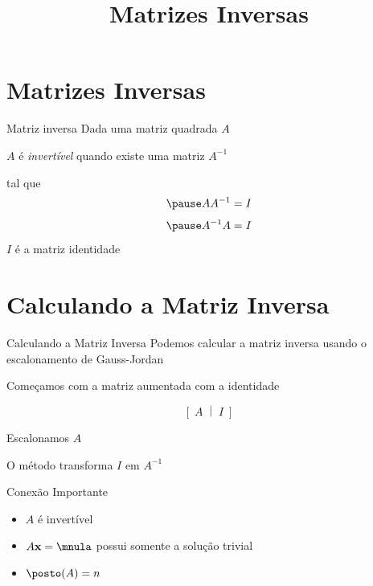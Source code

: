 \documentclass[fleqn,aspectratio=169,12pt]{beamer}
\title{Matrizes Inversas}
\begin{document}
\addtitle

\section{Matrizes Inversas}

\begin{frame}{Matriz inversa}
  Dada uma matriz quadrada $A$

  \pause
  $A$ é \emph{invertível}
  \pause
  quando existe uma matriz
  \emph{$A^{-1}$}

  \pause
  tal que
  \[
    \pause
    A A^{-1} = I
  \]
  \[
    \pause
    A^{-1} A = I
  \]
  \pause
  $I$ é a matriz identidade
\end{frame}



\section{Calculando a Matriz Inversa}

\begin{frame}{Calculando a Matriz Inversa}
  Podemos calcular a matriz inversa usando o escalonamento de Gauss-Jordan

  \pause
  Começamos com a matriz aumentada com a identidade

  \[
    \left[ \;A\; \middle| \;I\; \right]
  \]

  \pause
  Escalonamos $A$

  \pause
  O método transforma $I$ em $A^{-1}$
\end{frame}





\begin{frame}{Conexão Importante}
  \begin{itemize}[<+->]
  \setlength{\itemsep}{1em}
  \item
    \(
      A \text{ é invertível}
    \)
  \item
    \(
      A \mathbf{x} = \mnula
    \)
    possui somente a solução trivial
  \item
    \(
      \posto(A) = n
    \)
  \end{itemize}
\end{frame}
\end{document}

